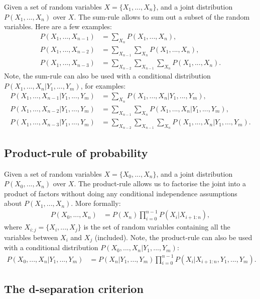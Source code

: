 \documentclass[twoside,11pt]{article}
\begin{document}
Given a set of random variables $X = \{X_1, ..., X_n\}$, and a joint distribution $P(X_1, ..., X_n)$ over $X$. The sum-rule allows to sum out a subset of the random variables. Here are a few examples:
\begin{align*}
P(X_1, ..., X_{n-1}) &= \sum_{X_n} P(X_1, ..., X_n),\\
P(X_1, ..., X_{n-2}) &= \sum_{X_{n-1}} \sum_{X_n} P(X_1, ..., X_n),\\
P(X_1, ..., X_{n-3}) &= \sum_{X_{n-2}} \sum_{X_{n-1}} \sum_{X_n} P(X_1, ..., X_n).
\end{align*}
Note, the sum-rule can also be used with a conditional distribution $P(X_1, ..., X_n|Y_1, ..., Y_m)$, for examples:
\begin{align*}
P(X_1, ..., X_{n-1}|Y_1, ..., Y_m) &= \sum_{X_n} P(X_1, ..., X_n|Y_1, ..., Y_m),\\
P(X_1, ..., X_{n-2}|Y_1, ..., Y_m) &= \sum_{X_{n-1}} \sum_{X_n} P(X_1, ..., X_n|Y_1, ..., Y_m),\\
P(X_1, ..., X_{n-3}|Y_1, ..., Y_m) &= \sum_{X_{n-2}} \sum_{X_{n-1}} \sum_{X_n} P(X_1, ..., X_n|Y_1, ..., Y_m).
\end{align*}

\subsection*{Product-rule of probability}

Given a set of random variables $X = \{X_0, ..., X_n\}$, and a joint distribution $P(X_0, ..., X_n)$ over $X$. The product-rule allows us to factorise the joint into a product of factors without doing any conditional independence assumptions about $P(X_1, ..., X_n)$. More formally:
\begin{align*}
P(X_0, ..., X_n) &= P(X_n)\prod_{i = 0}^{n-1} P(X_i|X_{i+1:n}),
\end{align*}
where $X_{i:j} = \{X_i, ..., X_j\}$ is the set of random variables containing all the variables between $X_i$ and $X_j$ (included). Note, the product-rule can also be used with a conditional distribution $P(X_0, ..., X_n|Y_1, ..., Y_m)$:
\begin{align*}
P(X_0, ..., X_n|Y_1, ..., Y_m) &= P(X_n|Y_1, ..., Y_m)\prod_{i = 0}^{n-1} P(X_i|X_{i+1:n}, Y_1, ..., Y_m).
\end{align*}

\subsection*{The d-separation criterion}
\end{document}
